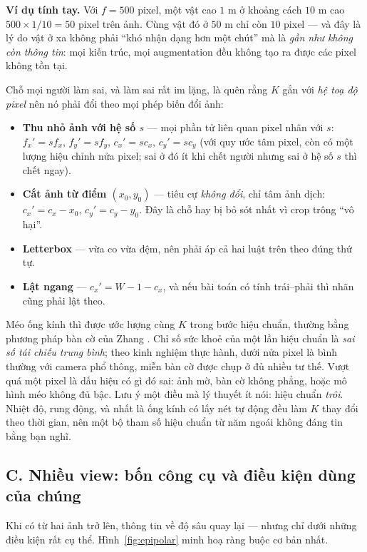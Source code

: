 \documentclass[../../../deep_learning.tex]{subfiles}
\begin{document}
\textbf{Ví dụ tính tay.} Với \(f = 500\) pixel, một vật cao \(1\) m ở khoảng cách \(10\) m cao \(500\times 1/10 = 50\) pixel trên ảnh. Cùng vật đó ở \(50\) m chỉ còn \(10\) pixel --- và đây là lý do vật ở xa không phải ``khó nhận dạng hơn một chút'' mà là \emph{gần như không còn thông tin}: mọi kiến trúc, mọi augmentation đều không tạo ra được các pixel không tồn tại.

Chỗ mọi người làm sai, và làm sai rất im lặng, là quên rằng \(K\) gắn với \emph{hệ toạ độ pixel} nên nó phải đổi theo mọi phép biến đổi ảnh:

\begin{itemize}
\item \textbf{Thu nhỏ ảnh với hệ số \(s\)} --- mọi phần tử liên quan pixel nhân với \(s\): \(f_x' = s f_x\), \(f_y' = s f_y\), \(c_x' = s c_x\), \(c_y' = s c_y\) (với quy ước tâm pixel, còn có một lượng hiệu chỉnh nửa pixel; sai ở đó ít khi chết người nhưng sai ở hệ số \(s\) thì chết ngay).
\item \textbf{Cắt ảnh từ điểm \((x_0,y_0)\)} --- tiêu cự \emph{không đổi}, chỉ tâm ảnh dịch: \(c_x' = c_x - x_0\), \(c_y' = c_y - y_0\). Đây là chỗ hay bị bỏ sót nhất vì crop trông ``vô hại''.
\item \textbf{Letterbox} --- vừa co vừa đệm, nên phải áp cả hai luật trên theo đúng thứ tự.
\item \textbf{Lật ngang} --- \(c_x' = W - 1 - c_x\), và nếu bài toán có tính trái--phải thì nhãn cũng phải lật theo.
\end{itemize}

Méo ống kính thì được ước lượng cùng \(K\) trong bước hiệu chuẩn, thường bằng phương pháp bàn cờ của Zhang \cite{zhang2000flexible}. Chỉ số sức khoẻ của một lần hiệu chuẩn là \emph{sai số tái chiếu trung bình}; theo kinh nghiệm thực hành, dưới nửa pixel là bình thường với camera phổ thông, miễn bàn cờ được chụp ở đủ nhiều tư thế. Vượt quá một pixel là dấu hiệu có gì đó sai: ảnh mờ, bàn cờ không phẳng, hoặc mô hình méo không đủ bậc. Lưu ý một điều mà lý thuyết ít nói: hiệu chuẩn \emph{trôi}. Nhiệt độ, rung động, và nhất là ống kính có lấy nét tự động đều làm \(K\) thay đổi theo thời gian, nên một bộ tham số hiệu chuẩn từ năm ngoái không đáng tin bằng bạn nghĩ.

\subsection{C. Nhiều view: bốn công cụ và điều kiện dùng của chúng}
Khi có từ hai ảnh trở lên, thông tin về độ sâu quay lại --- nhưng chỉ dưới những điều kiện rất cụ thể. Hình~\ref{fig:epipolar} minh hoạ ràng buộc cơ bản nhất.
\end{document}
